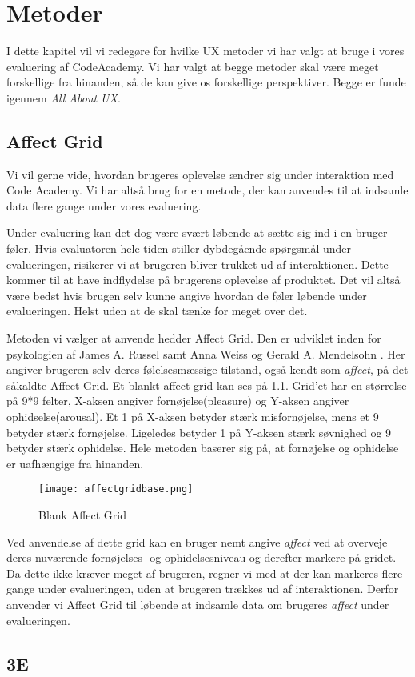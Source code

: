 \chapter{Metoder}\label{ch:met}
I dette kapitel vil vi redegøre for hvilke UX metoder vi har valgt at bruge i vores evaluering af CodeAcademy. Vi har valgt at begge metoder skal være meget forskellige fra hinanden, så de kan give os forskellige perspektiver. Begge er funde igennem \textit{All About UX}\cite{AllAboutUX}.


\section{Affect Grid}\label{sec:AG}
Vi vil gerne vide, hvordan brugeres oplevelse ændrer sig under interaktion med Code Academy. Vi har altså brug for en metode, der kan anvendes til at indsamle data flere gange under vores evaluering. 

Under evaluering kan det dog være svært løbende at sætte sig ind i en bruger føler. Hvis evaluatoren hele tiden stiller dybdegående spørgsmål under evalueringen, risikerer vi at brugeren bliver trukket ud af interaktionen. Dette kommer til at have indflydelse på brugerens oplevelse af produktet. Det vil altså være bedst hvis brugen selv kunne angive hvordan de føler løbende under evalueringen. Helst uden at de skal tænke for meget over det. 

Metoden vi vælger at anvende hedder Affect Grid. Den er udviklet inden for psykologien af James A. Russel samt Anna Weiss og Gerald A. Mendelsohn \cite{AffectGrid}. Her angiver brugeren selv deres følelsesmæssige tilstand, også kendt som \textit{affect}, på det såkaldte Affect Grid. Et blankt affect grid kan ses på \cref{fig:affectgrid}. Grid'et har en størrelse på 9*9 felter, X-aksen angiver fornøjelse(pleasure) og Y-aksen angiver ophidselse(arousal). Et 1 på X-aksen betyder stærk misfornøjelse, mens et 9 betyder stærk fornøjelse. Ligeledes betyder 1 på Y-aksen stærk søvnighed og 9 betyder stærk ophidelse. Hele metoden baserer sig på, at fornøjelse og ophidelse er uafhængige  fra hinanden. 

\begin{figure}[h]
\centering
\texttt{[image: affectgridbase.png]}
\caption{Blank Affect Grid}
\label{fig:affectgrid}
\end{figure}

Ved anvendelse af dette grid kan en bruger nemt angive \textit{affect} ved at overveje deres nuværende fornøjelses- og ophidelsesniveau og derefter markere på gridet. Da dette ikke kræver meget af brugeren, regner vi med at der kan markeres flere gange under evalueringen, uden at brugeren trækkes ud af interaktionen. Derfor anvender vi Affect Grid til løbende at indsamle data om brugeres \textit{affect} under evalueringen.


\section{3E}\label{sec:3E}

